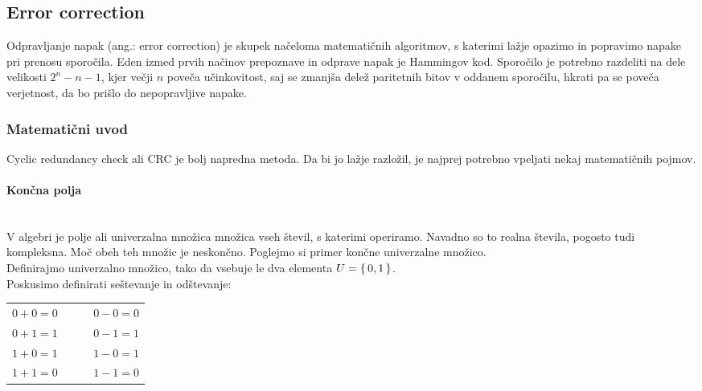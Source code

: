 \documentclass[12pt]{article}
\begin{document}
    \subsection{Error correction}
        Odpravljanje napak (ang.: error correction) je skupek načeloma 
        matematičnih algoritmov, s katerimi lažje opazimo in popravimo napake 
        pri prenosu sporočila.
        Eden izmed prvih načinov prepoznave in odprave napak je Hammingov kod. 
        Sporočilo je potrebno razdeliti na dele velikosti $2^n - n - 1$,
        kjer večji $n$ poveča učinkovitost, saj se zmanjša delež paritetnih
        bitov v oddanem sporočilu, hkrati pa se poveča verjetnost, da bo prišlo
        do nepopravljive napake.
        \subsubsection{Matematični uvod}
            Cyclic redundancy check ali CRC je bolj napredna metoda. Da bi jo 
            lažje razložil, je najprej potrebno vpeljati nekaj matematičnih 
            pojmov.
            \paragraph{Končna polja} \label{sec:polja} \mbox{}\\
                V algebri je polje ali univerzalna množica množica vseh števil,
                s katerimi operiramo. Navadno so to realna števila, pogosto tudi
                kompleksna. Moč obeh teh množic je neskončno. Poglejmo si primer
                končne univerzalne množico. \\
                Definirajmo univerzalno množico, tako 
                da vsebuje le dva elementa $U = \set{0, 1}$.\\
                Poskusimo definirati seštevanje in odštevanje:
                \begin{table}[h!]
                    \centering
                    \begin{tabular}{l p{0.2\linewidth}}
                        $0 + 0 = 0$  & $0 - 0 = 0$ \\
                        $0 + 1 = 1$  & $0 - 1 = 1$ \\
                        $1 + 0 = 1$  & $1 - 0 = 1$ \\
                        $1 + 1 = 0$  & $1 - 1 = 0$ \\
                    \end{tabular}
                \end{table}
\end{document}
